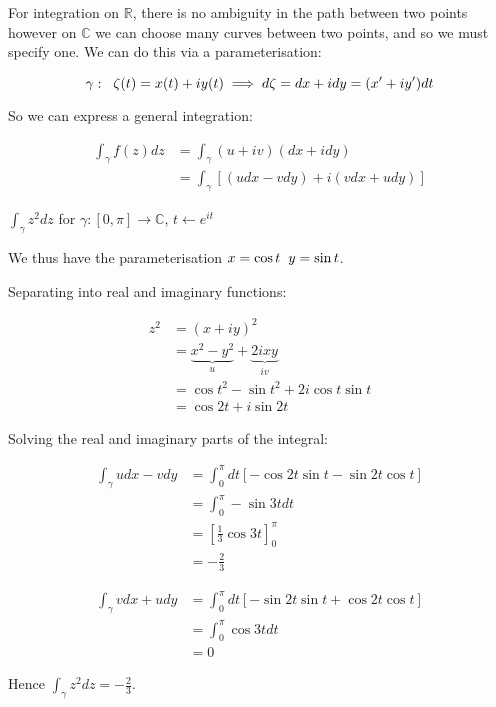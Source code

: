 \documentclass{../../physics_notes}
\begin{document}
For integration on $\mathbb{R}$, there is no ambiguity in the path between two points however on $\mathbb{C}$ we can choose many curves between two points, and so we must specify one. We can do this via a parameterisation:

\begin{equation*}
\gamma : \hspace{.2cm} \zeta (t) = x(t) + i y(t) \implies d\zeta = dx + i dy = (x' + i y')dt
\end{equation*}

So we can express a general integration:

\begin{align*}
\int_{\gamma} f(z) dz &= \int_{\gamma} (u + iv)(dx + idy) \\
&= \int_\gamma [(udx - vdy) + i(vdx + udy)]
\end{align*}

\begin{example}{$\int_\gamma z^2 dz$ for $\gamma: [0,\pi] \rightarrow \mathbb{C}$, $t \leftarrow e^{it}$}

We thus have the parameterisation $x = \cos{t} \hspace{.2cm} y = \sin{t}$.

Separating into real and imaginary functions:

\begin{align*}
z^2 &= (x + iy)^2 \\
&= \underbrace{x^2 - y^2}_{u} + \underbrace{2ixy}_{iv} \\
&= \cos{t}^2 - \sin{t}^2 + 2i\cos{t}\sin{t} \\
&= \cos{2t} + i\sin{2t}
\end{align*}

Solving the real and imaginary parts of the integral:

\begin{align*}
\int_\gamma udx - vdy &= \int_{0}^{\pi} dt \left[-\cos{2t}\sin{t} - \sin{2t}\cos{t}\right] \\
&= \int_{0}^{\pi}  - \sin{3t} dt \\
&= \left[\frac{1}{3}\cos{3t}\right]^{\pi}_{0} \\
&= -\frac{2}{3}
\end{align*}

\begin{align*}
\int_\gamma vdx + udy &= \int_{0}^{\pi} dt \left[-\sin{2t}\sin{t} + \cos{2t}\cos{t}\right] \\
&= \int_{0}^{\pi} \cos{3t} dt \\
&= 0
\end{align*}

Hence $\int_\gamma z^2 dz = -\frac{2}{3}$.
\end{example}
\end{document}
